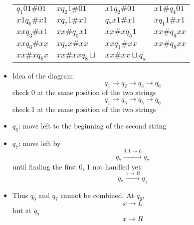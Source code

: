 \begin{frame}[allowframebreaks]
\begin{itemize}
\begin{center}
\begin{tabular}{llll}
  $q_1 0 1 \# 01$ & $x q_2 1 \# 01$ & $x1 q_2 \# 01$ & $x1\# q_4 01$
  \\
  $x1 q_6 \# x 1$ & $x q_7 1 \# x 1$ & $ q_7 x 1 \# x 1$ & $x q_1 1 \# x 1$
  \\
  $xx q_3 \# x 1$ & $xx \# q_5 x 1$ & $xx \# x q_5 1$ & $xx \# q_6 xx$ \\
  $xx q_6 \# xx$ & $x q_7 x \# xx$ & $xx q_1 \# xx$ & $xx \# q_8 xx$ \\
  $xx \# x q_8 x$ & $xx \# xx q_8 \sqcup$ & $xx \# xx \sqcup q_a$ &
\end{tabular}
\end{center}
\item Idea of the diagram:
  \begin{equation*}
    q_1 \rightarrow q_2 \rightarrow q_4 \rightarrow q_6
  \end{equation*}
  check 0 at the same position of the two strings
  \begin{equation*}
    q_1 \rightarrow q_3 \rightarrow q_5 \rightarrow q_6    
  \end{equation*}
  check 1
at the same position of the two strings
\item $q_6$: move left to the beginning of the second string
\item $q_7$: move left by
  \begin{equation*}
    q_7 \xrightarrow{0, 1 \rightarrow L} q_7
  \end{equation*}
until finding the first 0, 1 not handled yet:
\begin{equation*}
  q_7 \xrightarrow{x \rightarrow R} q_1
\end{equation*}
\item Thus $q_6$ and $q_7$ cannot be combined. At $q_6$,
  \begin{equation*}
    x \rightarrow L
  \end{equation*}
but at $q_7$
\begin{equation*}
  x \rightarrow R
\end{equation*}
\end{itemize}

\end{frame}

